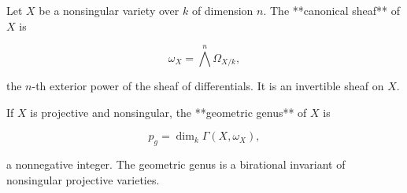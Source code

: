 Let $X$ be a nonsingular variety over $k$ of dimension $n$. The **canonical sheaf** of $X$ is

$$\omega_X = \bigwedge^n \Omega_{X/k},$$

the $n$-th exterior power of the sheaf of differentials. It is an invertible sheaf on $X$.

If $X$ is projective and nonsingular, the **geometric genus** of $X$ is

$$p_g = \dim_k \Gamma(X, \omega_X),$$

a nonnegative integer. The geometric genus is a birational invariant of nonsingular projective varieties.
